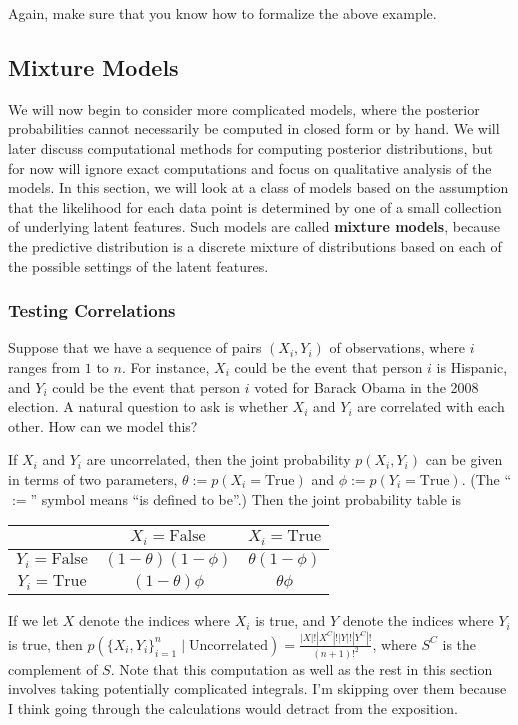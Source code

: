 \documentclass[11pt]{article}
\begin{document}
Again, make sure that you know how to formalize the above example.

\subsection{Mixture Models}
We will now begin to consider more complicated models, where the posterior probabilities cannot necessarily be computed in closed form or by hand. We will later discuss computational methods for computing posterior distributions, but for now will ignore exact computations and focus on qualitative analysis of the models. In this section, we will look at a class of models based on the assumption that the likelihood for each data point is determined by one of a small collection of underlying latent features. Such models are called \textbf{mixture models}, because the predictive distribution is a discrete mixture of distributions based on each of the possible settings of the latent features.

\subsubsection{Testing Correlations}

Suppose that we have a sequence of pairs $(X_i,Y_i)$ of observations, where $i$ ranges from $1$ to $n$. For instance, $X_i$ could be the event that person $i$ is Hispanic, and $Y_i$ could be the event that person $i$ voted for Barack Obama in the 2008 election. A natural question to ask is whether $X_i$ and $Y_i$ are correlated with each other. How can we model this?

If $X_i$ and $Y_i$ are uncorrelated, then the joint probability $p(X_i,Y_i)$ can be given in terms of two parameters, $\theta := p(X_i = \mathrm{True})$ and $\phi := p(Y_i = \mathrm{True})$. (The ``$:=$'' symbol means ``is defined to be''.) Then the joint probability table is

\vskip 0.1in

\begin{tabular}{|c|c|c|}
\hline
 & $X_i = \mathrm{False}$ & $X_i = \mathrm{True}$ \\
\hline
$Y_i = \mathrm{False}$ & $(1-\theta)(1-\phi)$ & $\theta(1-\phi)$ \\
\hline 
$Y_i = \mathrm{True}$ & $(1-\theta)\phi$ & $\theta\phi$ \\
\hline
\end{tabular}

\vskip 0.1in

If we let $X$ denote the indices where $X_i$ is true, and $Y$ denote the indices where $Y_i$ is true, then $p(\{X_i,Y_i\}_{i=1}^n \mid \mathrm{Uncorrelated}) = \frac{|X|!|X^C|!|Y|!|Y^C|!}{(n+1)!^2}$, where $S^C$ is the complement of $S$. Note that this computation as well as the rest in this section involves taking potentially complicated integrals. I'm skipping over them because I think going through the calculations would detract from the exposition.
\end{document}
